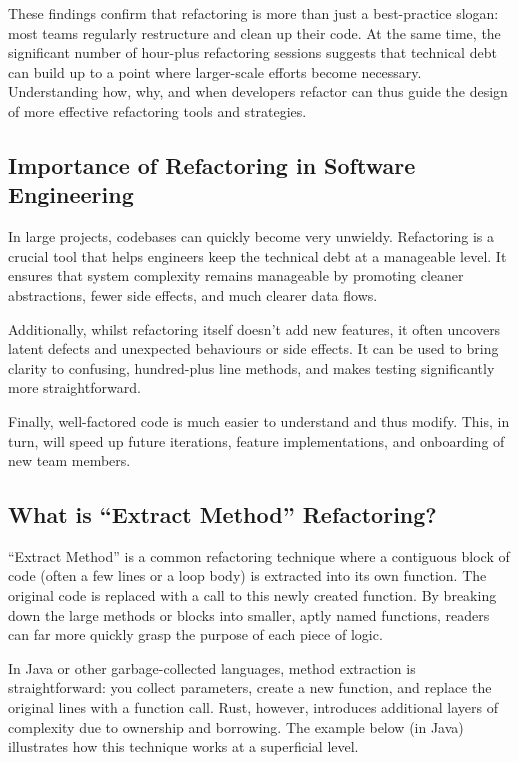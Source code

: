 These findings confirm that refactoring is more than just a best-practice
slogan: most teams regularly restructure and clean up their code. At the same
time, the significant number of hour-plus refactoring sessions suggests that
technical debt can build up to a point where larger-scale efforts become
necessary. Understanding how, why, and when developers refactor can thus guide
the design of more effective refactoring tools and strategies.

\subsection{Importance of Refactoring in Software Engineering}
\label{sec:importance-refactoring}

In large projects, codebases can quickly become very unwieldy. Refactoring is a
crucial tool that helps engineers keep the technical debt at a manageable level.
It ensures that system complexity remains manageable by promoting cleaner
abstractions, fewer side effects, and much clearer data flows.

Additionally, whilst refactoring itself doesn't add new features, it often
uncovers latent defects and unexpected behaviours or side effects. It can be
used to bring clarity to confusing, hundred-plus line methods, and makes testing
significantly more straightforward.

Finally, well-factored code is much easier to understand and thus modify. This,
in turn, will speed up future iterations, feature implementations, and
onboarding of new team members.

\subsection{What is “Extract Method” Refactoring?}
\label{sec:extract-method}

“Extract Method” is a common refactoring technique where a contiguous block of
code (often a few lines or a loop body) is extracted into its own function. The
original code is replaced with a call to this newly created function. By
breaking down the large methods or blocks into smaller, aptly named functions,
readers can far more quickly grasp the purpose of each piece of logic.

In Java or other garbage-collected languages, method extraction is
straightforward: you collect parameters, create a new function, and replace the
original lines with a function call. Rust, however, introduces additional layers
of complexity due to ownership and borrowing. The example below (in Java)
illustrates how this technique works at a superficial level.


